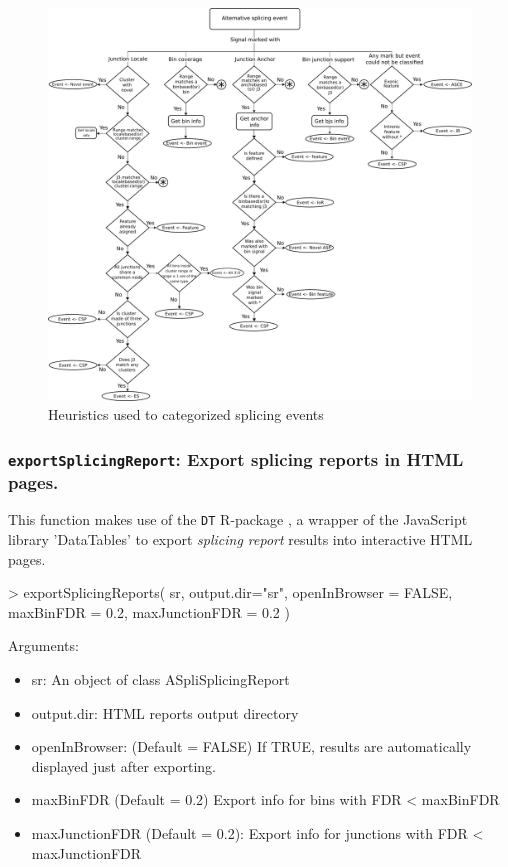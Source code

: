\documentclass{article}
\begin{document}
\begin{figure}[ht!]
\centering
\includegraphics[width=1.3\textwidth]{images/integrateSignals.png}
\caption{ Heuristics used to categorized splicing events }
\label{fig:integrateSignals}
\end{figure}


\subsubsection{\texttt{exportSplicingReport}: Export splicing reports in HTML pages.} \label{sec:reports}

This function makes use of the \texttt{DT} R-package \cite{DTpackage}, a wrapper of the JavaScript library 'DataTables' to export {\em splicing report} results into interactive HTML pages.

\begin{Schunk}
\begin{Sinput}
> exportSplicingReports( sr, 
                        output.dir="sr",
                        openInBrowser = FALSE, 
                        maxBinFDR = 0.2, 
                        maxJunctionFDR = 0.2 )
\end{Sinput}
\end{Schunk}

Arguments:
\begin{itemize}
\item sr:	An object of class ASpliSplicingReport
\item output.dir: HTML reports output directory 
\item openInBrowser: (Default = FALSE) If TRUE, results are automatically displayed just after exporting.	
\item maxBinFDR (Default = 0.2) Export info for bins with FDR < maxBinFDR
\item maxJunctionFDR (Default = 0.2): Export info for junctions with FDR < maxJunctionFDR
\end{itemize}
\end{document}
